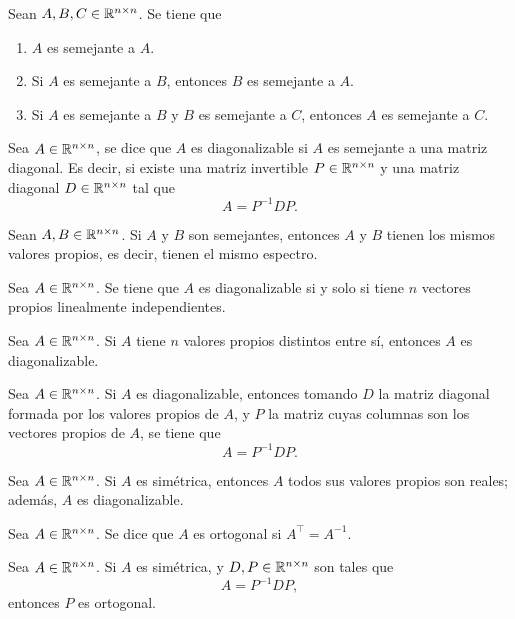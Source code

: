 \documentclass[a4,11pt]{aleph-notas}
\begin{document}
\begin{teo}
    Sean $A,B,C\in \Mat[\R]{n}{n}$. Se tiene que
    \begin{enumerate}
    \item 
        $A$ es semejante a $A$.
    \item
        Si $A$ es semejante a $B$, entonces $B$ es semejante a $A$.
    \item
        Si $A$ es semejante a $B$ y $B$ es semejante a $C$, entonces $A$ es semejante a $C$.
    \end{enumerate}
\end{teo}

\begin{defi}
    Sea $A\in \Mat[\R]{n}{n}$, se dice que $A$ es diagonalizable si $A$ es semejante a una matriz diagonal. Es decir, si existe una matriz invertible $P\in \Mat[\R]{n}{n}$ y una matriz diagonal $D\in \Mat[\R]{n}{n}$ tal que
    \[
        A = P^{-1} D P.
    \]
\end{defi}

\begin{teo}
    Sean $A,B\in \Mat[\R]{n}{n}$. Si $A$ y $B$ son semejantes, entonces $A$ y $B$ tienen los mismos valores propios, es decir, tienen el mismo espectro.
\end{teo}

\begin{teo}
    Sea $A\in \Mat[\R]{n}{n}$. Se tiene que $A$ es diagonalizable si y solo si tiene $n$ vectores propios linealmente independientes.
\end{teo}

\begin{teo}
    Sea $A\in \Mat[\R]{n}{n}$. Si $A$ tiene $n$ valores propios distintos entre sí, entonces $A$ es diagonalizable.
\end{teo}

\begin{teo}
    Sea $A\in \Mat[\R]{n}{n}$. Si $A$ es diagonalizable, entonces tomando $D$ la matriz diagonal formada por los valores propios de $A$, y $P$ la matriz cuyas columnas son los vectores propios de $A$, se tiene que
    \[
        A = P^{-1} D P.
    \]
\end{teo}

\begin{teo}
    Sea $A\in \Mat[\R]{n}{n}$. Si $A$ es simétrica, entonces $A$ todos sus valores propios son reales; además, $A$ es diagonalizable.
\end{teo}

\begin{defi}
    Sea $A\in \Mat[\R]{n}{n}$. Se dice que $A$ es ortogonal si $A^\intercal = A^{-1}$.
\end{defi}


\begin{teo}
    Sea $A\in \Mat[\R]{n}{n}$. Si $A$ es simétrica, y $D,P\in \Mat[\R]{n}{n}$ son tales que
    \[
        A = P^{-1} D P,
    \]
    entonces $P$ es ortogonal.
\end{teo}
\end{document}
